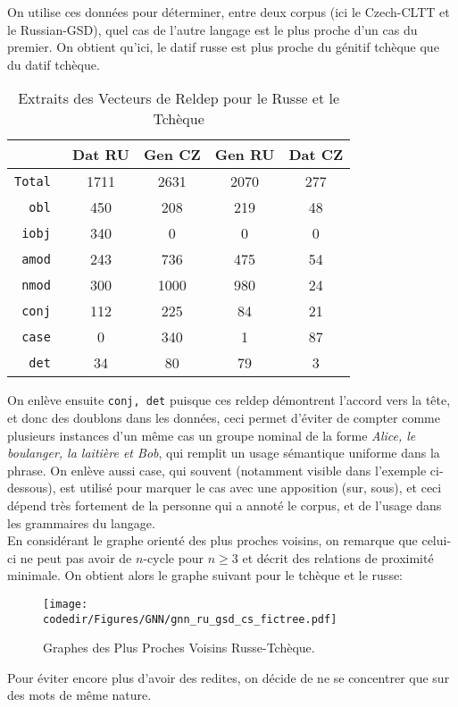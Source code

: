 \documentclass{cours}
\newcommand{\codedir}{Morphosyntactic-Categories_Code}
\begin{document}
    On utilise ces données pour déterminer, entre deux corpus (ici le Czech-CLTT et le Russian-GSD), quel cas de l'autre langage est le plus proche d'un cas du premier.
    On obtient qu'ici, le datif russe est plus proche du génitif tchèque que du datif tchèque.
    \begin{table}[H]
	    \centering
    \begin{tabular}{>{\tt}r|cccc}
        \toprule
        &Dat RU & Gen CZ & Gen RU & Dat CZ\\
        \midrule
        Total & 1711 & 2631 & 2070 & 277\\
        obl & 450 & 208 & 219 & 48\\
        iobj & 340 & 0 & 0 & 0\\
        amod & 243 & 736 & 475 & 54\\
        nmod & 300 & 1000 & 980 & 24\\
        conj & 112 & 225 & 84 & 21\\
        case & 0 & 340 & 1 & 87\\
        det & 34 & 80 & 79 & 3\\
        \bottomrule
    \end{tabular}
	\caption{Extraits des Vecteurs de Reldep pour le Russe et le Tchèque}
    \end{table}
    On enlève ensuite \texttt{conj, det} puisque ces reldep démontrent l'accord vers la tête, et donc des doublons dans les données, ceci permet d'éviter de compter comme plusieurs instances d'un même cas un groupe nominal de la forme \emph{Alice, le boulanger, la laitière et Bob}, qui remplit un usage sémantique uniforme dans la phrase.
    On enlève aussi case, qui souvent (notamment visible dans l'exemple ci-dessous), est utilisé pour marquer le cas avec une apposition (sur, sous), et ceci dépend très fortement de la personne qui a annoté le corpus, et de l'usage dans les grammaires du langage.\\
    En considérant le graphe orienté des plus proches voisins, on remarque que celui-ci ne peut pas avoir de $n$-cycle pour $n \geq 3$ et décrit des relations de proximité minimale.
    On obtient alors le graphe suivant pour le tchèque et le russe:
    \begin{figure}[H]
	    \centering
	    \texttt{[image: \\codedir/Figures/GNN/gnn\_ru\_gsd\_cs\_fictree.pdf]}
	    \caption{Graphes des Plus Proches Voisins Russe-Tchèque.}
    \end{figure}
    Pour éviter encore plus d'avoir des redites, on décide de ne se concentrer que sur des mots de même nature.
\end{document}
